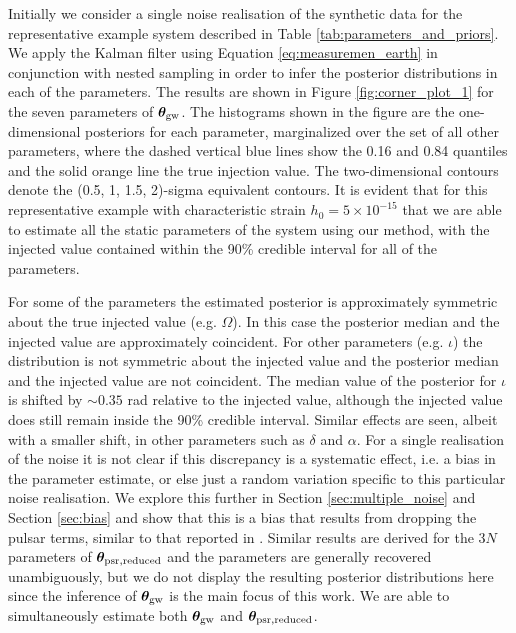 \documentclass[fleqn,usenatbib,useAMS]{mnras}
\begin{document}
	Initially we consider a single noise realisation of the synthetic data for the representative example system described in Table \ref{tab:parameters_and_priors}. We apply the Kalman filter using Equation \eqref{eq:measuremen_earth} in conjunction with nested sampling in order to infer the posterior distributions in each of the parameters. The results are shown in Figure \ref{fig:corner_plot_1} for the seven parameters of  $\boldsymbol{\theta}_{\rm gw}$. The histograms shown in the figure are the one-dimensional posteriors for each parameter, marginalized over the set of all other parameters, where the dashed vertical blue lines show the 0.16 and 0.84 quantiles and the solid orange line the true injection value. The two-dimensional contours denote the (0.5, 1, 1.5, 2)-sigma equivalent contours. It is evident that for this representative example with characteristic strain $h_0 = 5 \times 10^{-15}$ that we are able to estimate all the static parameters of the system using our method, with the injected value contained within the 90\% credible interval for all of the parameters. \newline 
 
 
 For some of the parameters the estimated posterior is approximately symmetric about the true injected value (e.g. $\Omega$). In this case the posterior median and the injected value are approximately coincident. For other parameters (e.g. $\iota$) the distribution is not symmetric about the injected value and the posterior median and the injected value are not coincident. The median value of the posterior for $\iota$ is shifted by $\sim 0.35$ rad relative to the injected value, although the injected value does still remain inside the 90\% credible interval. Similar effects are seen, albeit with a smaller shift, in other parameters such as $\delta$ and $\alpha$. For a single realisation of the noise it is not clear if this discrepancy is a systematic effect, i.e. a bias in the parameter estimate, or else just a random variation specific to this particular noise realisation. We explore this further in Section \ref{sec:multiple_noise} and Section \ref{sec:bias} and show that this is a bias that results from dropping the pulsar terms, similar to that reported in \cite{Zhupulsarterms}. Similar results are derived for the 3$N$ parameters of $\boldsymbol{\theta}_{\rm psr, reduced}$ and the parameters are generally recovered unambiguously, but we do not display the resulting posterior distributions here since the inference of $\boldsymbol{\theta}_{\rm gw}$ is the main focus of this work. We are able to simultaneously estimate both $\boldsymbol{\theta}_{\rm gw}$ and $\boldsymbol{\theta}_{\rm psr, reduced}$. 
 
\end{document}
